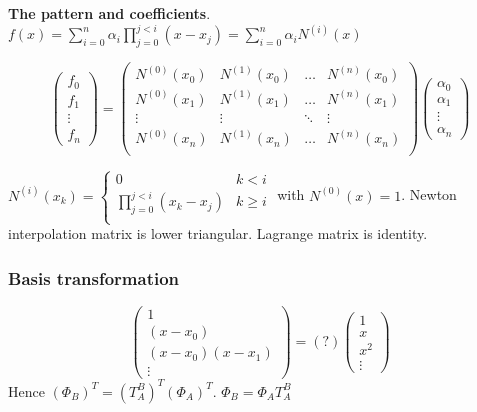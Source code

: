 \documentclass[11pt]{article}
\begin{document}
\textbf{The pattern and coefficients}.
\(f(x)=\displaystyle\sum_{i=0}^n\alpha_i
    \displaystyle\prod_{j=0}^{j<i}(x-x_j)
    =\displaystyle\sum_{i=0}^n\alpha_iN^{(i)}(x)\)

\begin{equation*}
\begin{pmatrix}
f_0\\
f_1\\
\vdots\\
f_n
\end{pmatrix}=
\begin{pmatrix}
N^{(0)}(x_0) & N^{(1)}(x_0) & \dots & N^{(n)}(x_0)\\
N^{(0)}(x_1) & N^{(1)}(x_1) & \dots & N^{(n)}(x_1)\\
\vdots & \vdots & \ddots&\vdots\\
N^{(0)}(x_n) & N^{(1)}(x_n) & \dots & N^{(n)}(x_n)\\
\end{pmatrix}
\begin{pmatrix}
\alpha_0\\
\alpha_1\\
\vdots\\
\alpha_n
\end{pmatrix}
\end{equation*}

\(N^{(i)}(x_k)=\begin{cases}
    0&k<i\\
    \prod_{j=0}^{j<i}(x_k-x_j)&k\ge i\\
    \end{cases}\) with \(N^{(0)}(x) = 1\).
Newton interpolation matrix is lower triangular.
Lagrange matrix is identity.
\subsubsection{Basis transformation}
\label{sec:org63478f1}
\begin{equation*}
\begin{pmatrix}
1\\
(x-x_0)\\
(x-x_0)(x-x_1)\\
\vdots
\end{pmatrix}=(?)
\begin{pmatrix}
1\\
x\\
x^2\\
\vdots
\end{pmatrix}
\end{equation*}
Hence \((\Phi_B)^T=(T_A^B)^T(\Phi_A)^T\).
\(\Phi_B=\Phi_AT_A^B\)
\end{document}
